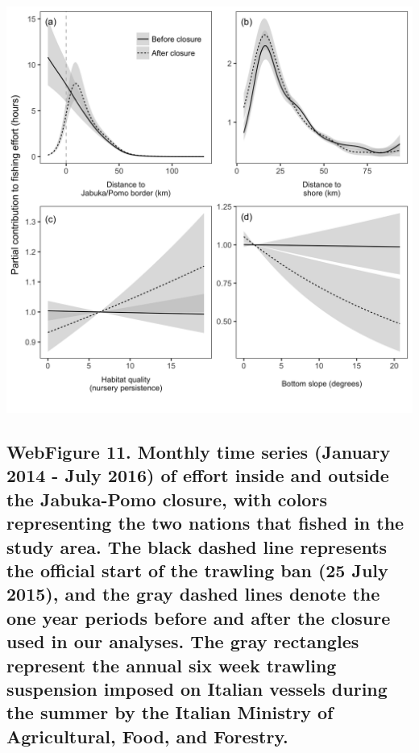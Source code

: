 \documentclass[11pt,]{article}
\begin{document}
\includegraphics[width=1.00000\textwidth]{../ms_1/ms_1_figs/plot_gam_partials_free_hrs.png}

\newpage

\subsection{WebFigure 11. Monthly time series (January 2014 - July 2016)
of effort inside and outside the Jabuka-Pomo closure, with colors
representing the two nations that fished in the study area. The black
dashed line represents the official start of the trawling ban (25 July
2015), and the gray dashed lines denote the one year periods before and
after the closure used in our analyses. The gray rectangles represent
the annual six week trawling suspension imposed on Italian vessels
during the summer by the Italian Ministry of Agricultural, Food, and
Forestry.}\label{webfigure-11.-monthly-time-series-january-2014---july-2016-of-effort-inside-and-outside-the-jabuka-pomo-closure-with-colors-representing-the-two-nations-that-fished-in-the-study-area.-the-black-dashed-line-represents-the-official-start-of-the-trawling-ban-25-july-2015-and-the-gray-dashed-lines-denote-the-one-year-periods-before-and-after-the-closure-used-in-our-analyses.-the-gray-rectangles-represent-the-annual-six-week-trawling-suspension-imposed-on-italian-vessels-during-the-summer-by-the-italian-ministry-of-agricultural-food-and-forestry.}
\end{document}
